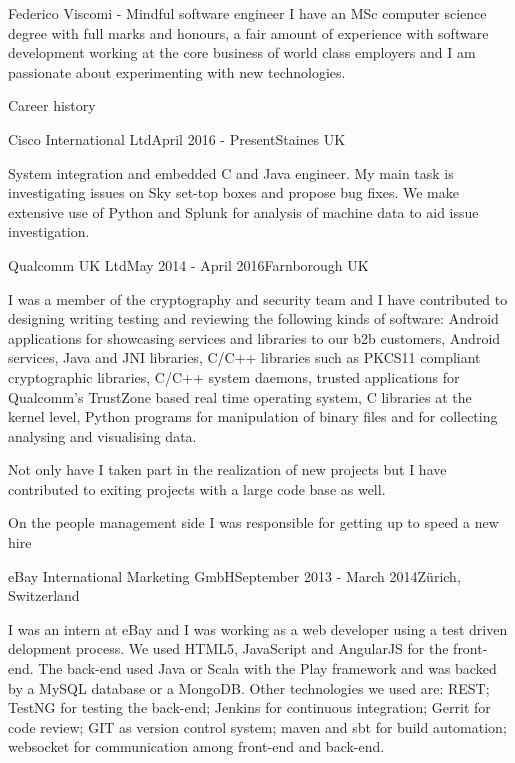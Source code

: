 \documentclass{resume}
\begin{document}
	\begin{rSection}{Federico Viscomi - Mindful software engineer}
		I have an MSc computer science degree with full marks and honours, 
		a fair amount of experience with software development working at the core business of world class employers 
		and I am passionate about experimenting with new technologies.
	\end{rSection}
	\begin{rSection}{Career history}
		\begin{rSubsection}{Cisco International Ltd}{April 2016 - Present}{}{Staines UK}
		\item[\null]
			System integration and embedded C and Java engineer. 
			My main task is investigating issues on Sky set-top boxes and propose bug fixes. 
			We make extensive use of Python and Splunk for analysis of machine data to aid issue investigation.
		\end{rSubsection}
		\begin{rSubsection}{Qualcomm UK Ltd}{May 2014 - April 2016}{}{Farnborough UK}
		\item[\null]
			I was a member of the cryptography and security team and I have contributed to designing writing testing and reviewing the following kinds of software:
			Android applications for showcasing services and libraries to our b2b customers,
			Android services, 
			Java and JNI libraries, 
			C/C++ libraries such as PKCS11 compliant cryptographic libraries,
			C/C++ system daemons,
			trusted applications for Qualcomm's TrustZone based real time operating system,
			C libraries at the kernel level,
			Python programs for manipulation of binary files and for collecting analysing and visualising data.
			
			Not only have I taken part in the realization of new projects but I have contributed to exiting projects with a large code base as well.
			
			On the people management side I was responsible for getting up to speed a new hire
		\end{rSubsection}
		\begin{rSubsection}{eBay International Marketing GmbH}{September 2013 - March 2014}{}{Z\"urich, Switzerland}
		\item[\null]
			I was an intern at eBay and I was working as a web developer using a test driven delopment process. 
			We used HTML5, JavaScript and AngularJS for the front-end. 
			The back-end used Java or Scala with the Play framework and was backed by a MySQL database or a MongoDB. 
			Other technologies we used are: 
			REST; TestNG for testing the back-end; 
			Jenkins for continuous integration; 
			Gerrit for code review; 
			GIT as version control system; 
			maven and sbt for build automation;
			websocket for communication among front-end and back-end.	  
	    

\end{rSubsection}
\end{rSection}
\end{document}
